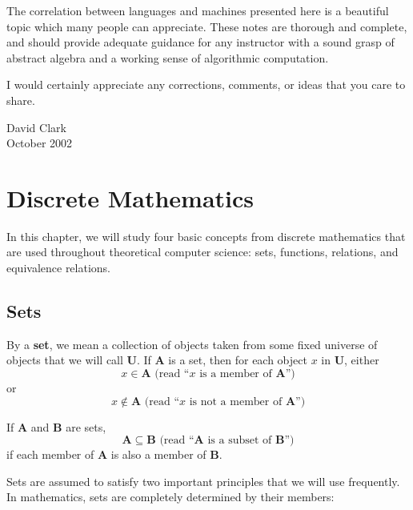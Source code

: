 \documentclass{article}
\newcommand{\A}{\mathbf A}
\newcommand{\B}{\mathbf B}
\newcommand{\U}{\mathbf U}
\begin{document}
The correlation between languages and machines presented here is a beautiful topic which many people can appreciate. These notes are thorough and complete, and should provide adequate guidance for any instructor with a sound grasp of abstract algebra and a working sense of algorithmic computation.

I would certainly appreciate any corrections, comments, or ideas that you care to share.

\begin{flushright}
David Clark \\
October 2002
\end{flushright}




\newpage

\section{Discrete Mathematics}



In this chapter, we will study four basic concepts from discrete mathematics that are used throughout theoretical computer science: sets, functions, relations, and equivalence relations.


\subsection{Sets} %


By a \textbf{set}, we mean a collection of objects taken from some fixed universe of objects that we will call $\U$. If $\A$ is a set, then for each object $x$ in $\U$, either
\begin{equation*}
x \in \A \text{ (read ``$x$ is a member of $\A$'')}
\end{equation*}
or
\begin{equation*}
x \notin \A \text{ (read ``$x$ is not a member of $\A$'')}
\end{equation*}

If $\A$ and $\B$ are sets,
\begin{equation*}
\A \subseteq \B \text{ (read ``$\A$ is a subset of $\B$'')}
\end{equation*}
if each member of $\A$ is also a member of $\B$.

Sets are assumed to satisfy two important principles that we will use frequently. In mathematics, sets are completely determined by their members:
\end{document}
